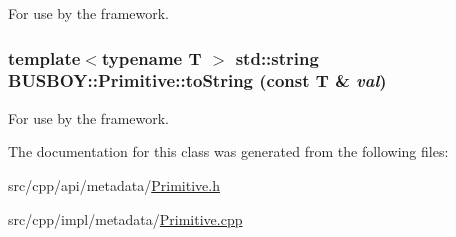 For use by the framework. \hypertarget{classBUSBOY_1_1Primitive_a55244fa8d9488ae8d9b1d1bd1eedbcf7}{
\subsubsection[{toString}]{\setlength{\rightskip}{0pt plus 5cm}template$<$typename T $>$ std::string BUSBOY::Primitive::toString (const T \& {\em val})}}
\label{classBUSBOY_1_1Primitive_a55244fa8d9488ae8d9b1d1bd1eedbcf7}


For use by the framework. 

The documentation for this class was generated from the following files:\begin{DoxyCompactItemize}
\item 
src/cpp/api/metadata/\hyperlink{Primitive_8h}{Primitive.h}\item 
src/cpp/impl/metadata/\hyperlink{Primitive_8cpp}{Primitive.cpp}\end{DoxyCompactItemize}
